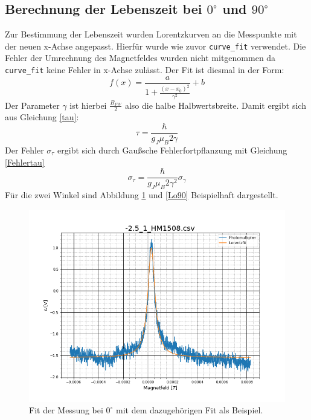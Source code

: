\subsection{Berechnung der Lebenszeit bei $0^\circ$ und $90^\circ$}
Zur Bestimmung der Lebenszeit wurden Lorentzkurven an die Messpunkte mit der neuen x-Achse angepasst. Hierfür wurde wie zuvor \verb|curve_fit| verwendet. Die Fehler der Umrechnung des Magnetfeldes wurden nicht mitgenommen da \verb|curve_fit| keine Fehler in x-Achse zulässt. Der Fit ist diesmal in der Form:
\begin{equation}
	f(x)=\frac{a}{1+\frac{\left(x-x_0\right)^2}{\gamma^2}}+b
	\label{Lorenzfit}
\end{equation}
Der Parameter $\gamma$ ist hierbei $\frac{B_{FW}}{2}$ also die halbe Halbwertsbreite. Damit ergibt sich aus Gleichung \ref{tau}:
\begin{equation}
	\tau=\frac{\hbar}{g_J\mu_B2\gamma}
\end{equation} 
Der Fehler $\sigma_\tau$ ergibt sich durch Gaußsche Fehlerfortpflanzung mit Gleichung \ref{Fehlertau}
\begin{equation}
	\sigma_\tau=\frac{\hbar}{g_J\mu_B2\gamma^2}\sigma_\gamma
	\label{Fehlertau}
\end{equation}
Für die zwei Winkel sind Abbildung \ref{Lo0} und \ref{Lo90} Beispielhaft dargestellt.\par
\begin{figure}[ht]
	\includegraphics[scale=0.5]{Bild/GradLorenz0}
	\centering
	\caption[Fit der Lorentzkurve bei Nullgrad]{Fit der Messung bei $0^\circ$ mit dem dazugehörigen Fit als Beispiel.}
	\label{Lo0}
\end{figure}
